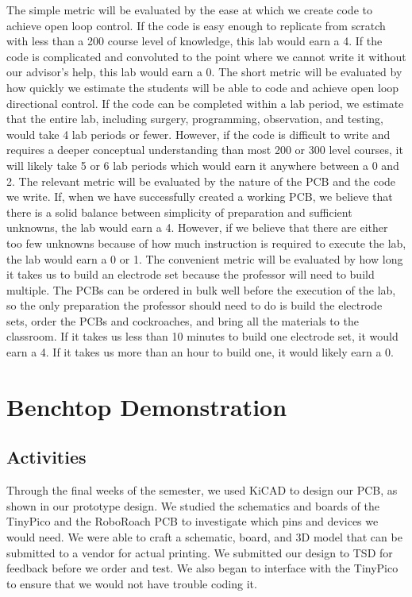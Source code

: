 \documentclass{article}
\begin{document}
 The simple metric will be evaluated by the ease at which we create code to achieve open loop control. If the code is easy enough to replicate from scratch with less than a 200 course level of knowledge, this lab would earn a 4. If the code is complicated and convoluted to the point where we cannot write it without our advisor's help, this lab would earn a 0. The short metric will be evaluated by how quickly we estimate the students will be able to code and achieve open loop directional control. If the code can be completed within a lab period, we estimate that the entire lab, including surgery, programming, observation, and testing, would take 4 lab periods or fewer. However, if the code is difficult to write and requires a deeper conceptual understanding than most 200 or 300 level courses, it will likely take 5 or 6 lab periods which would earn it anywhere between a 0 and 2. The relevant metric will be evaluated by the nature of the PCB and the code we write. If, when we have successfully created a working PCB, we believe that there is a solid balance between simplicity of preparation and sufficient unknowns, the lab would earn a 4. However, if we believe that there are either too few unknowns because of how much instruction is required to execute the lab, the lab would earn a 0 or 1. The convenient metric will be evaluated by how long it takes us to build an electrode set because the professor will need to build multiple. The PCBs can be ordered in bulk well before the execution of the lab, so the only preparation the professor should need to do is build the electrode sets, order the PCBs and cockroaches, and bring all the materials to the classroom. If it takes us less than 10 minutes to build one electrode set, it would earn a 4. If it takes us more than an hour to build one, it would likely earn a 0.

\section{Benchtop Demonstration}

\subsection{Activities}
 Through the final weeks of the semester, we used KiCAD to design our PCB, as shown in our prototype design. We studied the schematics and boards of the TinyPico and the RoboRoach PCB to investigate which pins and devices we would need. We were able to craft a schematic, board, and 3D model that can be submitted to a vendor for actual printing. We submitted our design to TSD for feedback before we order and test. We also began to interface with the TinyPico to ensure that we would not have trouble coding it.
\end{document}
